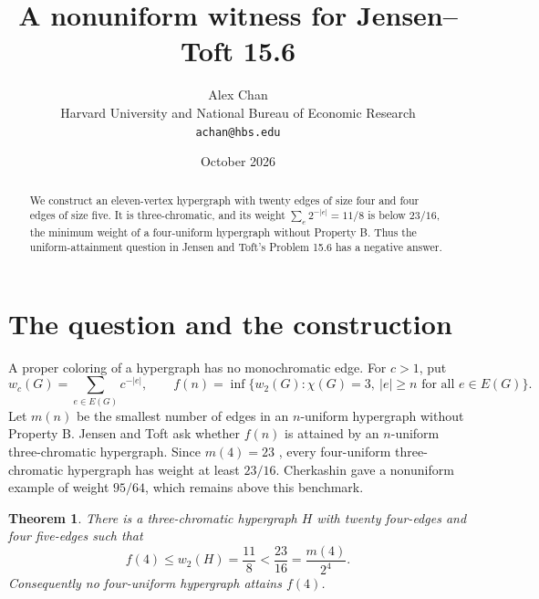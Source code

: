 \documentclass[11pt]{article}
\title{A nonuniform witness for Jensen--Toft 15.6}
\author{Alex Chan\\[2pt]
  \small Harvard University and National Bureau of Economic Research\\[-1pt]
  \small \texttt{achan@hbs.edu}}
\date{October 2026}
\newtheorem{theorem}{Theorem}
\begin{document}
\maketitle

\begin{abstract}
We construct an eleven-vertex hypergraph with twenty edges of size four and
four edges of size five. It is three-chromatic, and its weight
\(\sum_{e}2^{-|e|}=11/8\) is below \(23/16\), the minimum weight of a
four-uniform hypergraph without Property B. Thus the uniform-attainment
question in Jensen and Toft's Problem 15.6 has a negative answer.
\end{abstract}

\section{The question and the construction}
A proper coloring of a hypergraph has no monochromatic edge. For \(c>1\), put
\[
  w_c(G)=\sum_{e\in E(G)}c^{-|e|},\qquad
  f(n)=\inf\{w_2(G):\chi(G)=3,\ |e|\ge n\text{ for all }e\in E(G)\}.
\]
Let \(m(n)\) be the smallest number of edges in an \(n\)-uniform hypergraph
without Property B. Jensen and Toft \cite[Problem~15.6, pp.~235--236]{JT}
ask whether \(f(n)\) is attained by an \(n\)-uniform three-chromatic
hypergraph. Since \(m(4)=23\) \cite{Ostergard}, every four-uniform
three-chromatic hypergraph has weight at least \(23/16\). Cherkashin
\cite[\S2]{Cherkashin} gave a nonuniform example of weight \(95/64\), which
remains above this benchmark.

\begin{theorem}\label{thm:main}
There is a three-chromatic hypergraph \(H\) with twenty four-edges and four
five-edges such that
\[
  f(4)\le w_2(H)=\frac{11}{8}<\frac{23}{16}=\frac{m(4)}{2^4}.
\]
Consequently no four-uniform hypergraph attains \(f(4)\).
\end{theorem}
\end{document}
